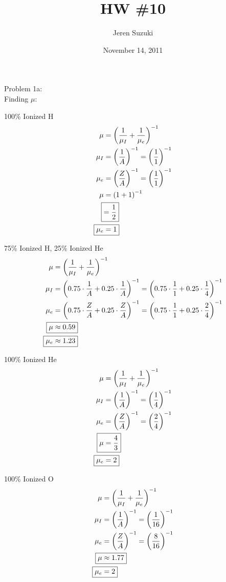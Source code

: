 \documentclass[10pt,letter,preprint]{aastex}
\newcommand{\rp}{\right)}
\newcommand{\lp}{\left(}
\begin{document}
\title{HW \#10}
\author{\begin{large}Jeren Suzuki\end{large}}
\author{November 14, 2011}

Problem 1a:\\

Finding $\mu$:

100\% Ionized H
\begin{align}
\mu &= \lp \frac{1}{\mu_I} + \frac{1}{\mu_e} \rp^{-1}\\
\mu_I &= \lp \frac{1}{A} \rp^{-1} =  \lp \frac{1}{1} \rp^{-1}\\
\mu_e &= \lp \frac{Z}{A}\rp^{-1}= \lp \frac{1}{1} \rp^{-1}\\
\mu &= \lp1+ 1 \rp^{-1}\\
\Aboxed{&= \frac{1}{2}}\\
\Aboxed{\mu_e &= 1}
\end{align}

75\% Ionized H, 25\% Ionized He
\begin{align}
\mu &= \lp \frac{1}{\mu_I} + \frac{1}{\mu_e} \rp^{-1}\\
\mu_I &= \lp 0.75 \cdot \frac{1}{A} +  0.25 \cdot  \frac{1}{A}\rp^{-1} = \lp 0.75 \cdot \frac{1}{1} +  0.25 \cdot  \frac{1}{4}\rp^{-1} \\
\mu_e &= \lp 0.75\cdot \frac{Z}{A}  + 0.25 \cdot \frac{Z}{A}\rp^{-1} = \lp 0.75 \cdot \frac{1}{1} +  0.25 \cdot  \frac{2}{4}\rp^{-1}  \\
\Aboxed{\mu &\approx 0.59}\\
\Aboxed{\mu_e &\approx 1.23}
\end{align}

100\% Ionized He
\begin{align}
\mu &= \lp \frac{1}{\mu_I} + \frac{1}{\mu_e} \rp^{-1}\\
\mu_I &= \lp \frac{1}{A} \rp^{-1}=  \lp \frac{1}{4} \rp^{-1}\\
\mu_e &= \lp \frac{Z}{A}\rp^{-1}=  \lp \frac{2}{4} \rp^{-1}\\
\Aboxed{\mu &= \frac{4}{3}}\\
\Aboxed{\mu_e &= 2}
\end{align}

100\% Ionized O
\begin{align}
\mu &= \lp \frac{1}{\mu_I} + \frac{1}{\mu_e} \rp^{-1}\\
\mu_I &= \lp \frac{1}{A} \rp^{-1} =  \lp \frac{1}{16} \rp^{-1}\\
\mu_e &= \lp \frac{Z}{A}\rp^{-1} =  \lp \frac{8}{16} \rp^{-1}\\
\Aboxed{\mu &\approx 1.77}\\
\Aboxed{\mu_e &= 2}
\end{align}
\end{document}
